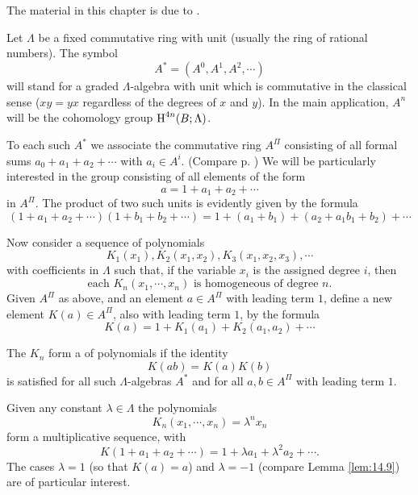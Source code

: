 \documentclass[../main]{subfiles}
\begin{document}
The material in this chapter is due to \cite{hirzebruchalggeo1966}.

Let $\Lambda$ be a fixed commutative ring with unit (usually the ring of rational numbers). The symbol \[A^\ast = (A^0, A^1, A^2, \cdots)\] will stand for a graded $\Lambda$-algebra with unit which is commutative in the classical sense ($xy = yx$ regardless of the degrees of $x$ and $y$). In the main application, $A^n$ will be the cohomology group $\operatorname{H}^{4n}(B;\Lambda)$.

To each such $A^\ast$ we associate the commutative ring $A^\Pi$ consisting of all formal sums $a_0 + a_1 + a_2 + \cdots$ with $a_i \in A^i$. (Compare p. \pageref{prop:04.04}) We will be particularly interested in the group consisting of all elements of the form \[a = 1+a_1 + a_2 + \cdots \] in $A^\Pi$. The product of two such units is evidently given by the formula \[(1+a_1 + a_2 + \cdots)(1+b_1 + b_2 + \cdots) = 1 + (a_1 + b_1) + (a_2 + a_1b_1 + b_2) + \cdots \]

Now consider a sequence of polynomials \[K_1(x_1), K_2(x_1,x_2), K_3(x_1,x_2,x_3),\cdots \] with coefficients in $\Lambda$ such that, if the variable $x_i$ is the assigned degree $i$, then 
\begin{equation}\label{eqn:19.1}
    \text{each }K_n(x_1,\cdots,x_n) \text{ is homogeneous of degree }n.
\end{equation}
Given $A^\Pi$ as above, and an element $a \in A^\Pi$ with leading term $1$, define a new element $K(a) \in A^\Pi$, also with leading term $1$, by the formula \[K(a) = 1+K_1(a_1) + K_2(a_1,a_2) + \cdots \]

\begin{definition}
The $K_n$ form a  of polynomials if the identity
\begin{equation}\label{eqn:19.2}
    K(ab) = K(a)K(b)
\end{equation}
is satisfied for all such $\Lambda$-algebras $A^\ast$ and for all $a, b\in A^\Pi$ with leading term $1$.
\end{definition}
\setcounter{example}{0}
\begin{example}
Given any constant $\lambda \in \Lambda$ the polynomials \[K_n(x_1,\cdots,x_n) = \lambda^n x_n \] form a multiplicative sequence, with \[K(1+a_1+a_2+\cdots) = 1 + \lambda a_1 + \lambda^2 a_2 + \cdots .\] The cases $\lambda = 1$ (so that $K(a) = a$) and $\lambda = -1$ (compare Lemma \ref{lem:14.9}) are of particular interest.
\end{example}
\end{document}
